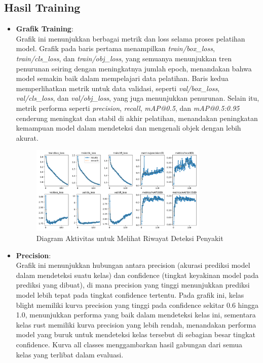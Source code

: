 \documentclass[journal,article,submit,pdftex,moreauthors]{Definitions/mdpi}
\begin{document}
\subsection{Hasil Training}
\begin{itemize}
    \item {\textbf{Grafik Training}}: \\ 
      \hspace*{2em}Grafik ini menunjukkan berbagai metrik dan loss selama proses pelatihan model. 
        Grafik pada baris pertama menampilkan \textit{train/box\_loss}, \textit{train/cls\_loss}, dan \textit{train/obj\_loss}, yang semuanya menunjukkan tren penurunan seiring dengan meningkatnya jumlah epoch, menandakan bahwa model semakin baik dalam mempelajari data pelatihan. 
        Baris kedua memperlihatkan metrik untuk data validasi, seperti \textit{val/box\_loss}, \textit{val/cls\_loss}, dan \textit{val/obj\_loss}, yang juga menunjukkan penurunan. 
        Selain itu, metrik performa seperti \textit{precision}, \textit{recall}, \textit{mAP@0.5}, dan \textit{mAP@0.5:0.95} cenderung meningkat dan stabil di akhir pelatihan, menandakan peningkatan kemampuan model dalam mendeteksi dan mengenali objek dengan lebih akurat.
    \begin{figure}[H]
        \centering
        \includegraphics[width=0.8\textwidth]{Images/results.png}
        \caption{\centering Diagram Aktivitas untuk Melihat Riwayat Deteksi Penyakit}
        \label{fig:activity-view-history}
    \end{figure}
    \item {\textbf{Precision}}: \\ 
       \hspace*{2em}Grafik ini menunjukkan hubungan antara precision (akurasi prediksi model dalam mendeteksi suatu kelas) dan confidence (tingkat keyakinan model pada prediksi yang dibuat), di mana precision yang tinggi menunjukkan prediksi model lebih tepat pada tingkat confidence tertentu. Pada grafik ini, kelas blight memiliki kurva precision yang tinggi pada confidence sekitar 0.6 hingga 1.0, menunjukkan performa yang baik dalam mendeteksi kelas ini, sementara kelas rust memiliki kurva precision yang lebih rendah, menandakan performa model yang buruk untuk mendeteksi kelas tersebut di sebagian besar tingkat confidence. Kurva all classes menggambarkan hasil gabungan dari semua kelas yang terlibat dalam evaluasi.

\end{itemize}
\end{document}
